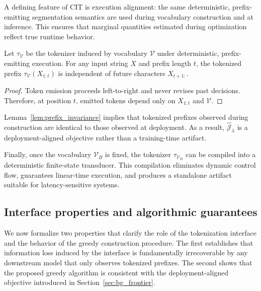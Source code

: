 A defining feature of CIT is execution alignment: the same deterministic, prefix-emitting segmentation semantics
are used during vocabulary construction and at inference.
This ensures that marginal quantities estimated during optimization reflect true runtime behavior.

\begin{lemma}
\label{lem:prefix_invariance}
Let $\tau_{\mathcal{V}}$ be the tokenizer induced by vocabulary $\mathcal{V}$ under deterministic,
prefix-emitting execution.
For any input string $X$ and prefix length $t$, the tokenized prefix $\tau_{\mathcal{V}}(X_{1:t})$ is
independent of future characters $X_{t+1:}$.
\end{lemma}

\begin{proof}
Token emission proceeds left-to-right and never revises past decisions.
Therefore, at position $t$, emitted tokens depend only on $X_{1:t}$ and $\mathcal{V}$.
\end{proof}

Lemma~\ref{lem:prefix_invariance} implies that tokenized prefixes observed during construction are identical to
those observed at deployment.
As a result, $\widehat{\mathcal{J}}_\lambda$ is a deployment-aligned objective rather than a training-time
artifact.

Finally, once the vocabulary $\mathcal{V}_B$ is fixed, the tokenizer $\tau_{\mathcal{V}_B}$ can be compiled into
a deterministic finite-state transducer.
This compilation eliminates dynamic control flow, guarantees linear-time execution, and produces a standalone
artifact suitable for latency-sensitive systems.

\subsection{Interface properties and algorithmic guarantees}
\label{sec:alg_properties}

We now formalize two properties that clarify the role of the tokenization interface and the behavior of
the greedy construction procedure.
The first establishes that information loss induced by the interface is fundamentally irrecoverable by
any downstream model that only observes tokenized prefixes.
The second shows that the proposed greedy algorithm is consistent with the deployment-aligned objective
introduced in Section~\ref{sec:bg_frontier}.

